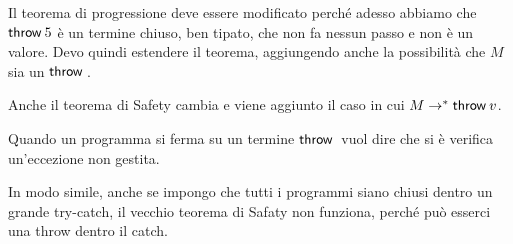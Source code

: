 Il teorema di progressione deve essere modificato perché adesso abbiamo che $\throw{5}$ è un termine chiuso, ben tipato, che non fa nessun passo e non è un valore. Devo quindi estendere il teorema, aggiungendo anche la possibilità che $M$ sia un $\throw{}$.

Anche il teorema di Safety cambia e viene aggiunto il caso in cui $M\to^* \throw{v}$.

Quando un programma si ferma su un termine $\throw{}$ vuol dire che si è verifica un'eccezione non gestita.

In modo simile, anche se impongo che tutti i programmi siano chiusi dentro un grande try-catch, il vecchio teorema di Safaty non funziona, perché può esserci una throw dentro il catch.









